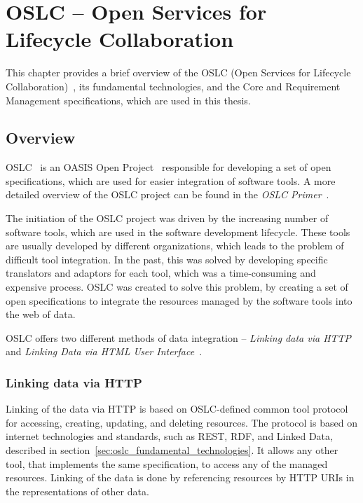 
\chapter{OSLC -- Open Services for Lifecycle Collaboration}
This chapter provides a brief overview of the OSLC (Open Services for Lifecycle Collaboration) \cite{oslc}, its fundamental technologies, and the Core and Requirement Management specifications, which are used in this thesis.

\section{Overview}
OSLC \cite{oslc} is an OASIS Open Project \cite{oasis_open} responsible for developing a set of open specifications, which are used for easier integration of software tools. A more detailed overview of the OSLC project can be found in the \emph{OSLC Primer} \cite{oslc_primer}.

The initiation of the OSLC project was driven by the increasing number of software tools, which are used in the software development lifecycle. These tools are usually developed by different organizations, which leads to the problem of difficult tool integration. In the past, this was solved by developing specific translators and adaptors for each tool, which was a time-consuming and expensive process. OSLC was created to solve this problem, by creating a set of open specifications to integrate the resources managed by the software tools into the web of data.

OSLC offers two different methods of data integration -- \emph{Linking data via HTTP} and \emph{Linking Data via HTML User Interface} \cite{oslc_primary_integration_techniques}.


\subsection*{Linking data via HTTP}
Linking of the data via HTTP is based on OSLC-defined common tool protocol for accessing, creating, updating, and deleting resources. The protocol is based on internet technologies and standards, such as REST, RDF, and Linked Data, described in section \ref{sec:oslc_fundamental_technologies}. It allows any other tool, that implements the same specification, to access any of the managed resources. Linking of the data is done by referencing resources by HTTP URIs in the representations of other data.

